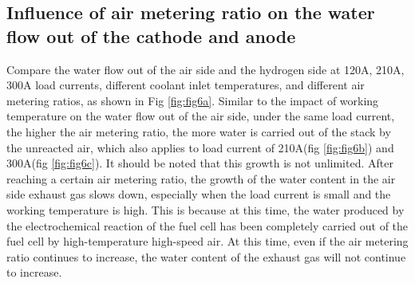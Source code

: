 \subsection{Influence of air metering ratio on the water flow out of the cathode and anode}

Compare the water flow out of the air side and the hydrogen side at 120A, 210A, 300A load currents, different coolant inlet temperatures, and different air metering ratios, as shown in Fig \ref{fig:fig6a}. Similar to the impact of working temperature on the water flow out of the air side, under the same load current, the higher the air metering ratio, the more water is carried out of the stack by the unreacted air, which also applies to load current of 210A(fig \ref{fig:fig6b}) and 300A(fig \ref{fig:fig6c}). It should be noted that this growth is not unlimited. After reaching a certain air metering ratio, the growth of the water content in the air side exhaust gas slows down, especially when the load current is small and the working temperature is high. This is because at this time, the water produced by the electrochemical reaction of the fuel cell has been completely carried out of the fuel cell by high-temperature high-speed air. At this time, even if the air metering ratio continues to increase, the water content of the exhaust gas will not continue to increase.

